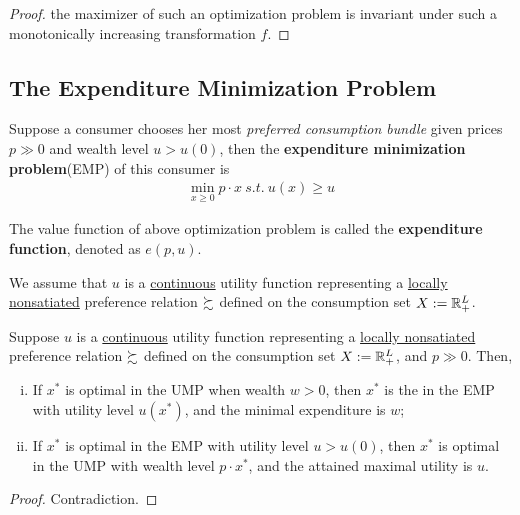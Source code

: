 \documentclass{article}
\begin{document}
 			\begin{proof}
 				the maximizer of such an optimization problem is invariant under such a monotonically increasing transformation $f$.
 			\end{proof}
 			
 		\subsection{The Expenditure Minimization Problem}
 			\begin{definition}
 				Suppose a consumer chooses her most \emph{preferred consumption bundle} given prices $p \gg 0$ and wealth level $u > u(0)$, then the \textbf{expenditure minimization problem}(EMP) of this consumer is
 				\begin{align}
 					\min_{x \geq 0} p \cdot x \ s.t.\ u(x) \geq u
 				\end{align}
 			\end{definition}
 			
 			\begin{definition}
 				The value function of above optimization problem is called the \textbf{expenditure function}, denoted as $e(p, u)$.
 			\end{definition}
 			
 			\begin{assumption}
 				We assume that $u$ is a \ul{continuous} utility function representing a \ul{locally nonsatiated} preference relation $\succsim$ defined on the consumption set $X := \mathbb{R}^L_+$.
 			\end{assumption}
 			
 			\begin{proposition}
 				Suppose $u$ is a \ul{continuous} utility function representing a \ul{locally nonsatiated} preference relation $\succsim$ defined on the consumption set $X := \mathbb{R}^L_+$, and $p \gg 0$. Then,
 				\begin{enumerate}[(i)]
 					\item If $x^*$ is optimal in the UMP when wealth $w > 0$, then $x^*$ is the in the EMP with utility level $u(x^*)$, and the minimal expenditure is $w$;
 					\item If $x^*$ is optimal in the EMP with utility level $u > u(0)$, then $x^*$ is optimal in the UMP with wealth level $p \cdot x^*$, and the attained maximal utility is $u$.
 				\end{enumerate}
 			\end{proposition}
 			\begin{proof}
 				Contradiction.
 			\end{proof}
 			
\end{document}
